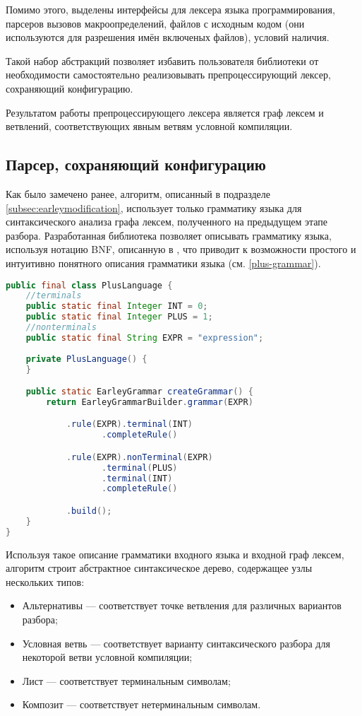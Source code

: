 Помимо этого, выделены интерфейсы для лексера языка программирования, парсеров вызовов макроопределений, файлов с исходным кодом (они используются для разрешения имён включеных файлов), условий наличия.

Такой набор абстракций позволяет избавить пользователя библиотеки от необходимости самостоятельно реализовывать препроцессирующий лексер, сохраняющий конфигурацию.

Результатом работы препроцессирующего лексера является граф лексем и ветвлений, соответствующих явным ветвям условной компиляции.

\subsection{Парсер, сохраняющий конфигурацию}

Как было замечено ранее, алгоритм, описанный в подразделе \ref{subsec:earleymodification}, использует только грамматику языка для синтаксического анализа графа лексем, полученного на предыдущем этапе разбора. Разработанная библиотека позволяет описывать грамматику языка, используя нотацию BNF, описанную в \cite{cfg}, что приводит к возможности простого и интуитивно понятного описания грамматики языка  (см. \autoref{plus-grammar}).

\begin{minipage}{\linewidth}
\begin{lstlisting}[caption={Пример описания грамматики простого языка.},label=plus-grammar,language=Java]
public final class PlusLanguage {
	//terminals
	public static final Integer INT = 0;
	public static final Integer PLUS = 1;
	//nonterminals
	public static final String EXPR = "expression";
	
	private PlusLanguage() {
	}

	public static EarleyGrammar createGrammar() {
		return EarleyGrammarBuilder.grammar(EXPR)

			.rule(EXPR).terminal(INT)
				   .completeRule()

			.rule(EXPR).nonTerminal(EXPR)
				   .terminal(PLUS)
				   .terminal(INT)
				   .completeRule()

			.build();
	}
}
\end{lstlisting}
\end{minipage}

Используя такое описание грамматики входного языка и входной граф лексем, алгоритм строит абстрактное синтаксическое дерево, содержащее узлы нескольких типов:

\begin{itemize}
\item Альтернативы --- соответствует точке ветвления для различных вариантов разбора;
\item Условная ветвь --- соответствует варианту синтаксического разбора для некоторой ветви условной компиляции;
\item Лист --- соответствует терминальным символам;
\item Композит --- соответствует нетерминальным символам.
\end{itemize}

